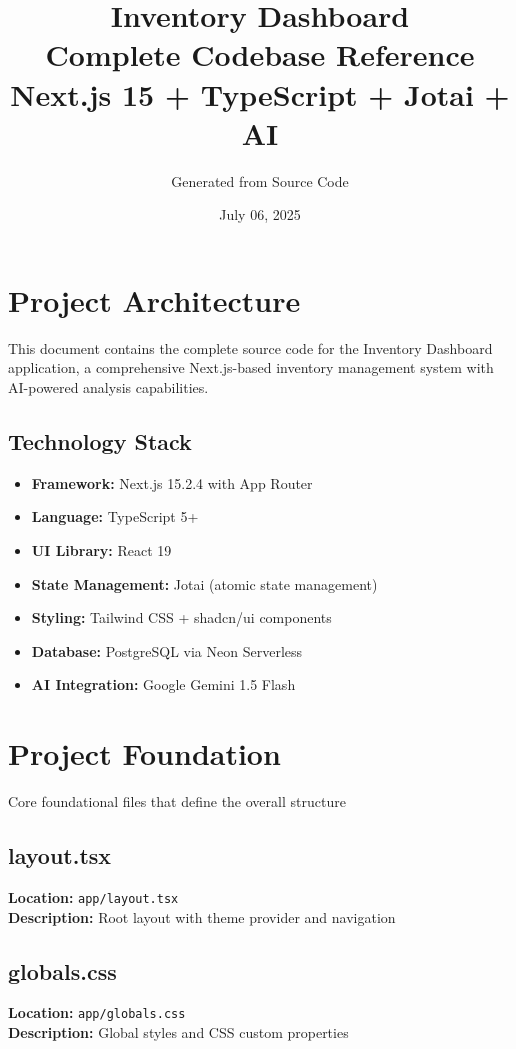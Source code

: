 \documentclass[11pt,twoside,openright]{book}
\title{\Huge\textbf{Inventory Dashboard}\\
\Large Complete Codebase Reference\\
\vspace{1cm}
\large Next.js 15 + TypeScript + Jotai + AI}
\author{Generated from Source Code}
\date{July 06, 2025}
\newcommand{\filepath}[1]{\texttt{#1}}
\newcommand{\codesection}[3]{
    \section{#1}
    \textbf{Location:} \filepath{#2}\\
    \textbf{Description:} #3\\
}
\begin{document}
\maketitle
\thispagestyle{empty}

\cleardoublepage
\tableofcontents

\cleardoublepage
\chapter{Project Architecture}

This document contains the complete source code for the Inventory Dashboard application, a comprehensive Next.js-based inventory management system with AI-powered analysis capabilities.

\section{Technology Stack}
\begin{itemize}
    \item \textbf{Framework:} Next.js 15.2.4 with App Router
    \item \textbf{Language:} TypeScript 5+
    \item \textbf{UI Library:} React 19
    \item \textbf{State Management:} Jotai (atomic state management)
    \item \textbf{Styling:} Tailwind CSS + shadcn/ui components
    \item \textbf{Database:} PostgreSQL via Neon Serverless
    \item \textbf{AI Integration:} Google Gemini 1.5 Flash
\end{itemize}


\cleardoublepage
\chapter{Project Foundation}

Core foundational files that define the overall structure


\codesection{layout.tsx}{app/layout.tsx}{Root layout with theme provider and navigation}



\clearpage


\codesection{globals.css}{app/globals.css}{Global styles and CSS custom properties}
\end{document}

